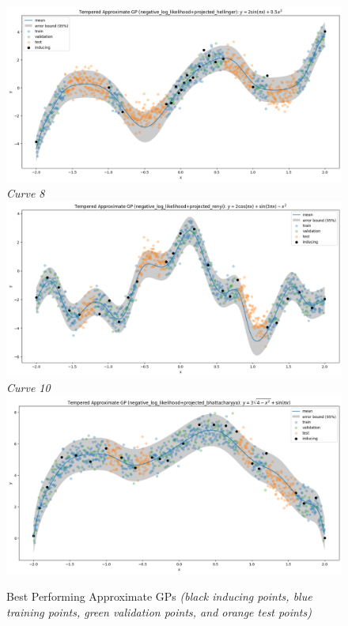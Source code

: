 \documentclass{article}
\numberwithin{equation}{section}
\begin{document}
\begin{figure}[h!]
\begin{minipage}{.5\textwidth}
  \includegraphics[width=\linewidth, trim={0 0 0 0.83cm},clip]{thesis-report/figures/toy_curves/curve5.png}
  \textit{Curve 8}
  \includegraphics[width=\linewidth, trim={0 0 0 0.85cm},clip]{thesis-report/figures/toy_curves/curve7.png}
  \textit{Curve 10}
  \includegraphics[width=\linewidth, trim={0 0 0 1.05cm},clip]{thesis-report/figures/toy_curves/curve9.png}
  \end{minipage}%
\caption{Best Performing Approximate GPs \textit{(black inducing points, blue training points, green validation points, and orange test points)}}
\label{figure:toy-curves-gps}
\end{figure}
\end{document}
